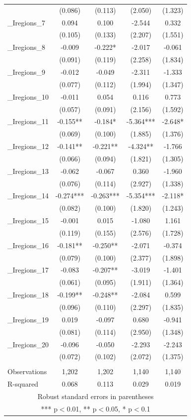 \documentclass[]{article}
\begin{document}
\begin{tabular}{lcccc}
 & (0.086) & (0.113) & (2.050) & (1.323) \\
\_Iregions\_7 & 0.094 & 0.100 & -2.544 & 0.332 \\
 & (0.105) & (0.133) & (2.207) & (1.551) \\
\_Iregions\_8 & -0.009 & -0.222* & -2.017 & -0.061 \\
 & (0.091) & (0.119) & (2.258) & (1.834) \\
\_Iregions\_9 & -0.012 & -0.049 & -2.311 & -1.333 \\
 & (0.077) & (0.112) & (1.994) & (1.347) \\
\_Iregions\_10 & -0.011 & 0.054 & 0.116 & 0.773 \\
 & (0.057) & (0.091) & (2.156) & (1.592) \\
\_Iregions\_11 & -0.155** & -0.184* & -5.364*** & -2.648* \\
 & (0.069) & (0.100) & (1.885) & (1.376) \\
\_Iregions\_12 & -0.141** & -0.221** & -4.324** & -1.766 \\
 & (0.066) & (0.094) & (1.821) & (1.305) \\
\_Iregions\_13 & -0.062 & -0.067 & 0.360 & -1.960 \\
 & (0.076) & (0.114) & (2.927) & (1.338) \\
\_Iregions\_14 & -0.274*** & -0.263*** & -5.354*** & -2.118* \\
 & (0.082) & (0.100) & (1.820) & (1.243) \\
\_Iregions\_15 & -0.001 & 0.015 & -1.080 & 1.161 \\
 & (0.119) & (0.155) & (2.576) & (1.728) \\
\_Iregions\_16 & -0.181** & -0.250** & -2.071 & -0.374 \\
 & (0.079) & (0.100) & (2.377) & (1.898) \\
\_Iregions\_17 & -0.083 & -0.207** & -3.019 & -1.401 \\
 & (0.061) & (0.095) & (1.911) & (1.364) \\
\_Iregions\_18 & -0.199** & -0.248** & -2.084 & 0.599 \\
 & (0.096) & (0.110) & (2.297) & (1.835) \\
\_Iregions\_19 & 0.019 & -0.097 & 0.680 & -0.941 \\
 & (0.081) & (0.114) & (2.950) & (1.348) \\
\_Iregions\_20 & -0.096 & -0.050 & -2.293 & -2.243 \\
 & (0.072) & (0.102) & (2.072) & (1.375) \\
 &  &  &  &  \\
Observations & 1,202 & 1,202 & 1,140 & 1,140 \\
 R-squared & 0.068 & 0.113 & 0.029 & 0.019 \\ \hline
\multicolumn{5}{c}{ Robust standard errors in parentheses} \\
\multicolumn{5}{c}{ *** p$<$0.01, ** p$<$0.05, * p$<$0.1} \\
\end{tabular}
\end{document}
